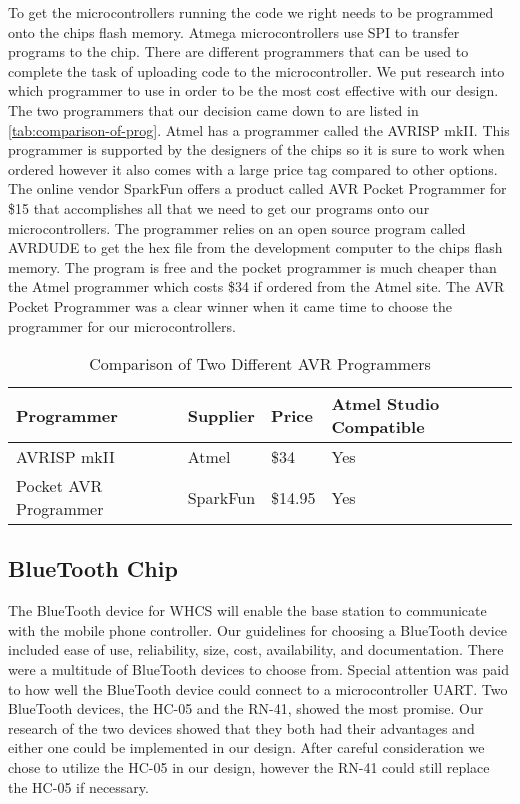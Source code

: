 To get the microcontrollers running the code we right needs to be programmed
onto the chips flash memory. Atmega microcontrollers use SPI to transfer
programs to the chip. There are different programmers that can be used to
complete the task of uploading code to the microcontroller. We put research
into which programmer to use in order to be the most cost effective with our
design. The two programmers that our decision came down to are listed in
\autoref{tab:comparison-of-prog}. Atmel has a programmer called the AVRISP mkII. This
programmer is supported by the designers of the chips so it is sure to work
when ordered however it also comes with a large price tag compared to other
options. The online vendor SparkFun offers a product called AVR Pocket
Programmer for \$15 that accomplishes all that we need to get our programs onto
our microcontrollers. The programmer relies on an open source program called
AVRDUDE to get the hex file from the development computer to the chips flash
memory. The program is free and the pocket programmer is much cheaper than the
Atmel programmer which costs \$34 if ordered from the Atmel site. The AVR
Pocket Programmer was a clear winner when it came time to choose the programmer
for our microcontrollers.

\begin{table}[H]
\centering
\begin{tabular}{|l|l|l|l|}
\hline
{\color{black} Programmer} &
{\color{black} Supplier} &
{\color{black} Price} &
{\color{black} Atmel Studio Compatible}\\\hline
{\color{black} AVRISP mkII} &
{\color{black} Atmel} &
{\color{black} \$34} &
{\color{black} Yes}\\\hline
{\color{black} Pocket AVR Programmer} &
{\color{black} SparkFun} &
{\color{black} \$14.95} &
{\color{black} Yes}\\\hline
\end{tabular}
\caption{Comparison of Two Different AVR Programmers}
\label{tab:comparison-of-prog}
\end{table}

\subsection{BlueTooth Chip}
The BlueTooth device for WHCS will enable the base station to communicate with
the mobile phone controller. Our guidelines for choosing a BlueTooth device
included ease of use, reliability, size, cost, availability, and documentation.
There were a multitude of BlueTooth devices to choose from. Special attention
was paid to how well the BlueTooth device could connect to a microcontroller
UART. Two BlueTooth devices, the HC{}-05 and the RN{}-41, showed the most
promise. Our research of the two devices showed that they both had their
advantages and either one could be implemented in our design. After careful
consideration we chose to utilize the HC{}-05 in our design, however the
RN{}-41 could still replace the HC{}-05 if necessary.

